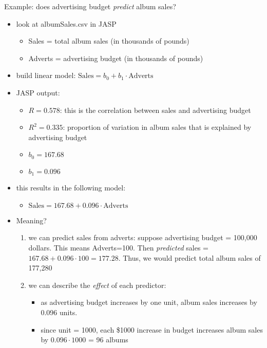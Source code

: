 \documentclass[11pt]{article}
\begin{document}
Example: does advertising budget \emph{predict} album sales?
\begin{itemize}
\item look at albumSales.csv in JASP
\begin{itemize}
\item Sales = total album sales (in thousands of pounds)
\item Adverts = advertising budget (in thousands of pounds)
\end{itemize}
\item build linear model: $\text{Sales} = b_0 + b_1\cdot \text{Adverts}$
\item JASP output:
\begin{itemize}
\item $R = 0.578$: this is the correlation between sales and advertising budget
\item $R^2 = 0.335$: proportion of variation in album sales that is explained by advertising budget
\item $b_0 = 167.68$
\item $b_1 = 0.096$
\end{itemize}
\item this results in the following model:
\begin{itemize}
\item $\text{Sales} = 167.68 + 0.096\cdot\text{Adverts}$
\end{itemize}
\item Meaning?
\begin{enumerate}
\item we can predict sales from adverts: suppose advertising budget = 100,000 dollars.  This means Adverts=100.  Then \emph{predicted} sales = $167.68+0.096\cdot 100=177.28$.  Thus, we would predict total album sales of 177,280
\item we can describe the \emph{effect} of each predictor:
\begin{itemize}
\item as advertising budget increases by one unit, album sales increases by 0.096 units.
\item since unit = 1000, each \$1000 increase in budget increases album sales by $0.096\cdot 1000$ = 96 albums
\end{itemize}
\end{enumerate}
\end{itemize}
\end{document}
